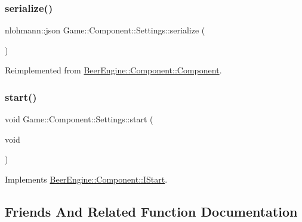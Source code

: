 \subsubsection{\texorpdfstring{serialize()}{serialize()}}
{\footnotesize\ttfamily nlohmann\+::json Game\+::\+Component\+::\+Settings\+::serialize (\begin{DoxyParamCaption}{ }\end{DoxyParamCaption})\hspace{0.3cm}{\ttfamily [virtual]}}



Reimplemented from \mbox{\hyperlink{class_beer_engine_1_1_component_1_1_component_a4d82d8a6b22b93514e0585fa4073041f}{Beer\+Engine\+::\+Component\+::\+Component}}.

\mbox{\label{class_game_1_1_component_1_1_settings_adc79077ed00bee2d8ed987ea4b86a331}} 
\subsubsection{\texorpdfstring{start()}{start()}}
{\footnotesize\ttfamily void Game\+::\+Component\+::\+Settings\+::start (\begin{DoxyParamCaption}\item[{void}]{ }\end{DoxyParamCaption})\hspace{0.3cm}{\ttfamily [virtual]}}



Implements \mbox{\hyperlink{class_beer_engine_1_1_component_1_1_i_start_aa3e25e86e20c46cdaefc6f6d7f21e495}{Beer\+Engine\+::\+Component\+::\+I\+Start}}.



\subsection{Friends And Related Function Documentation}
\mbox{\label{class_game_1_1_component_1_1_settings_a2fac0e654b3e111d2eaa4472da05740d}} 
